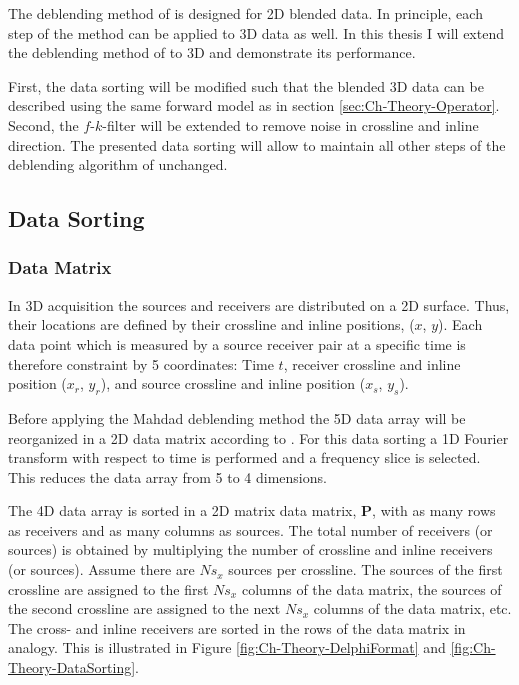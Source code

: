 The deblending method of \citet{Mahdad-Deblending-Method} is designed for 2D blended data. In principle, each step of the method can be applied to 3D data as well. In this thesis I will extend the deblending method of \citet{Mahdad-Deblending-Method} to 3D and demonstrate its performance.

First, the data sorting will be modified such that the blended 3D data can be described using the same forward model as in section \ref{sec:Ch-Theory-Operator}. Second, the $f$-$k$-filter will be extended to remove noise in crossline and inline direction. The presented data sorting will allow to maintain all other steps of the deblending algorithm of \citet{Mahdad-Deblending-Method} unchanged.

\subsection{Data Sorting} \label{sec:Ch-Theory-3dExtension-DataSorting}

\subsubsection*{Data Matrix}

In 3D acquisition the sources and receivers are distributed on a 2D surface. Thus, their locations are defined by their crossline and inline positions, ($x$, $y$). Each data point which is measured by a source receiver pair at a specific time is therefore constraint by 5 coordinates: Time $t$, receiver crossline and inline position ($x_r$, $y_r$), and source crossline and inline position ($x_s$, $y_s$).

Before applying the Mahdad deblending method the 5D data array will be reorganized in a 2D data matrix according to \citet{Delphi-Format}. For this data sorting a 1D Fourier transform with respect to time is performed and a frequency slice is selected. This reduces the data array from 5 to 4 dimensions. 

The 4D data array is sorted in a 2D matrix data matrix, $\mathbf{P}$, with as many rows as receivers and as many columns as sources. The total number of receivers (or sources) is obtained by multiplying the number of crossline and inline receivers (or sources). Assume there are $Ns_x$ sources per crossline. The sources of the first crossline are assigned to the first $Ns_x$ columns of the data matrix, the sources of the second crossline are assigned to the next $Ns_x$ columns of the data matrix, etc. The cross- and inline receivers are sorted in the rows of the data matrix in analogy. This is illustrated in Figure \ref{fig:Ch-Theory-DelphiFormat} and \ref{fig:Ch-Theory-DataSorting}. 

